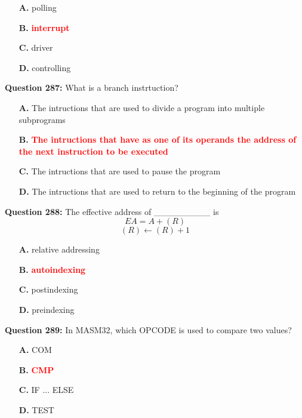 \documentclass[12pt,a4paper]{article}
\begin{document}
\begin{itemize}
    \item[\textbf{A.}] polling
    \item[\textbf{B.}] \textcolor{red}{\textbf{interrupt}}
    \item[\textbf{C.}] driver
    \item[\textbf{D.}] controlling
\end{itemize}

\vspace{0.5cm}

\textbf{Question 287:} What is a branch instrtuction?

\begin{itemize}
    \item[\textbf{A.}] The intructions that are used to divide a program into multiple subprograms
    \item[\textbf{B.}] \textcolor{red}{\textbf{The intructions that have as one of its operands the address of the next instruction to be executed}}
    \item[\textbf{C.}] The intructions that are used to pause the program
    \item[\textbf{D.}] The intructions that are used to return to the beginning of the program
\end{itemize}

\vspace{0.5cm}

\textbf{Question 288:} The effective address of _________ is
$$EA = A + (R)$$
$$(R) \leftarrow (R) + 1$$

\begin{itemize}
    \item[\textbf{A.}] relative addressing
    \item[\textbf{B.}] \textcolor{red}{\textbf{autoindexing}}
    \item[\textbf{C.}] postindexing
    \item[\textbf{D.}] preindexing
\end{itemize}

\vspace{0.5cm}

\textbf{Question 289:} In MASM32, which OPCODE is used to compare two values?

\begin{itemize}
    \item[\textbf{A.}] COM
    \item[\textbf{B.}] \textcolor{red}{\textbf{CMP}}
    \item[\textbf{C.}] IF ... ELSE
    \item[\textbf{D.}] TEST
\end{itemize}
\end{document}
